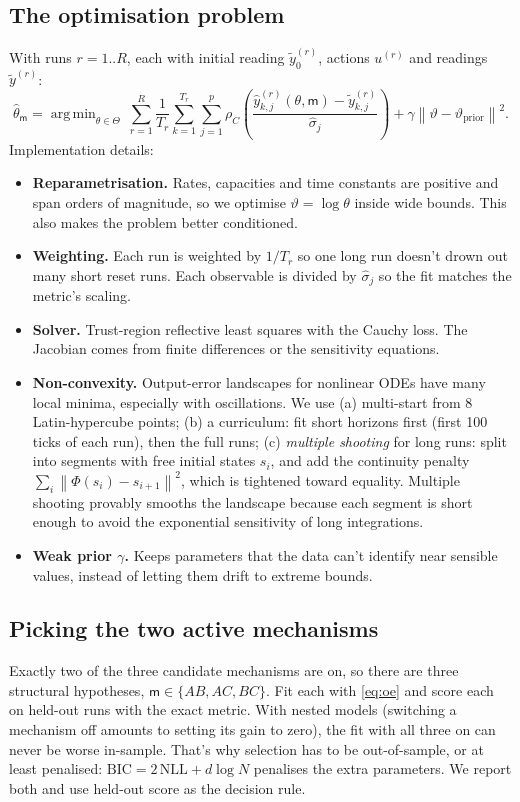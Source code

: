\documentclass[11pt]{article}
\theoremstyle{plain}
\theoremstyle{definition}
\theoremstyle{remark}
\newcommand{\norm}[1]{\left\lVert #1 \right\rVert}
\DeclareMathOperator*{\argmin}{arg\,min}
\begin{document}
\subsection{The optimisation problem}
With runs $r=1..R$, each with initial reading $\tilde y_0^{(r)}$, actions $u^{(r)}$ and readings $\tilde y^{(r)}$:
\begin{equation}\label{eq:oe}
\hat\theta_{\mathsf m}=\argmin_{\theta\in\Theta}\ \sum_{r=1}^{R}\frac{1}{T_r}\sum_{k=1}^{T_r}\sum_{j=1}^{p}\rho_C\!\left(\frac{\hat y^{(r)}_{k,j}(\theta,\mathsf m)-\tilde y^{(r)}_{k,j}}{\hat\sigma_j}\right)+\gamma\norm{\vartheta-\vartheta_{\text{prior}}}^2.
\end{equation}
Implementation details:
\begin{itemize}
\item \textbf{Reparametrisation.} Rates, capacities and time constants are positive and span orders of magnitude, so we optimise $\vartheta=\log\theta$ inside wide bounds. This also makes the problem better conditioned.
\item \textbf{Weighting.} Each run is weighted by $1/T_r$ so one long run doesn't drown out many short reset runs. Each observable is divided by $\hat\sigma_j$ so the fit matches the metric's scaling.
\item \textbf{Solver.} Trust-region reflective least squares with the Cauchy loss. The Jacobian comes from finite differences or the sensitivity equations.
\item \textbf{Non-convexity.} Output-error landscapes for nonlinear ODEs have many local minima, especially with oscillations. We use (a) multi-start from 8 Latin-hypercube points; (b) a curriculum: fit short horizons first (first 100 ticks of each run), then the full runs; (c) \emph{multiple shooting} for long runs: split into segments with free initial states $s_i$, and add the continuity penalty $\sum_i\norm{\Phi(s_i)-s_{i+1}}^2$, which is tightened toward equality. Multiple shooting provably smooths the landscape because each segment is short enough to avoid the exponential sensitivity of long integrations.
\item \textbf{Weak prior $\gamma$.} Keeps parameters that the data can't identify near sensible values, instead of letting them drift to extreme bounds.
\end{itemize}

\subsection{Picking the two active mechanisms}
Exactly two of the three candidate mechanisms are on, so there are three structural hypotheses, $\mathsf m\in\{AB,AC,BC\}$. Fit each with \eqref{eq:oe} and score each on held-out runs with the exact metric. With nested models (switching a mechanism off amounts to setting its gain to zero), the fit with all three on can never be worse in-sample. That's why selection has to be out-of-sample, or at least penalised: $\text{BIC}=2\,\text{NLL}+d\log N$ penalises the extra parameters. We report both and use held-out score as the decision rule.
\end{document}
